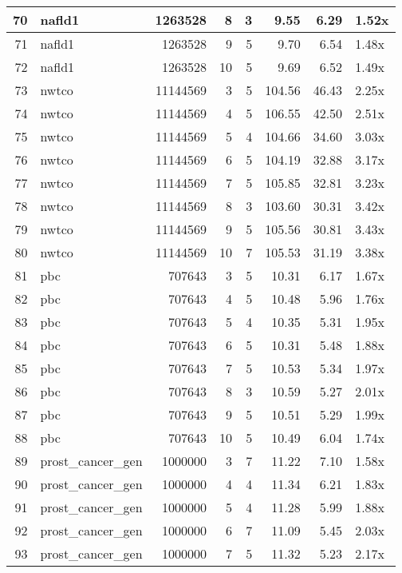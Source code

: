 \begin{table}[ht]
\begin{tabular}{rlrrrrrl}
   \hline
70 & nafld1 & 1263528 &   8 &   3 & 9.55 & 6.29 & 1.52x \\ 
   \hline
71 & nafld1 & 1263528 &   9 &   5 & 9.70 & 6.54 & 1.48x \\ 
   \hline
72 & nafld1 & 1263528 &  10 &   5 & 9.69 & 6.52 & 1.49x \\ 
   \hline
73 & nwtco & 11144569 &   3 &   5 & 104.56 & 46.43 & 2.25x \\ 
   \hline
74 & nwtco & 11144569 &   4 &   5 & 106.55 & 42.50 & 2.51x \\ 
   \hline
75 & nwtco & 11144569 &   5 &   4 & 104.66 & 34.60 & 3.03x \\ 
   \hline
76 & nwtco & 11144569 &   6 &   5 & 104.19 & 32.88 & 3.17x \\ 
   \hline
77 & nwtco & 11144569 &   7 &   5 & 105.85 & 32.81 & 3.23x \\ 
   \hline
78 & nwtco & 11144569 &   8 &   3 & 103.60 & 30.31 & 3.42x \\ 
   \hline
79 & nwtco & 11144569 &   9 &   5 & 105.56 & 30.81 & 3.43x \\ 
   \hline
80 & nwtco & 11144569 &  10 &   7 & 105.53 & 31.19 & 3.38x \\ 
   \hline
81 & pbc & 707643 &   3 &   5 & 10.31 & 6.17 & 1.67x \\ 
   \hline
82 & pbc & 707643 &   4 &   5 & 10.48 & 5.96 & 1.76x \\ 
   \hline
83 & pbc & 707643 &   5 &   4 & 10.35 & 5.31 & 1.95x \\ 
   \hline
84 & pbc & 707643 &   6 &   5 & 10.31 & 5.48 & 1.88x \\ 
   \hline
85 & pbc & 707643 &   7 &   5 & 10.53 & 5.34 & 1.97x \\ 
   \hline
86 & pbc & 707643 &   8 &   3 & 10.59 & 5.27 & 2.01x \\ 
   \hline
87 & pbc & 707643 &   9 &   5 & 10.51 & 5.29 & 1.99x \\ 
   \hline
88 & pbc & 707643 &  10 &   5 & 10.49 & 6.04 & 1.74x \\ 
   \hline
89 & prost\_cancer\_gen & 1000000 &   3 &   7 & 11.22 & 7.10 & 1.58x \\ 
   \hline
90 & prost\_cancer\_gen & 1000000 &   4 &   4 & 11.34 & 6.21 & 1.83x \\ 
   \hline
91 & prost\_cancer\_gen & 1000000 &   5 &   4 & 11.28 & 5.99 & 1.88x \\ 
   \hline
92 & prost\_cancer\_gen & 1000000 &   6 &   7 & 11.09 & 5.45 & 2.03x \\ 
   \hline
93 & prost\_cancer\_gen & 1000000 &   7 &   5 & 11.32 & 5.23 & 2.17x \\ 

\end{tabular}
\end{table}
